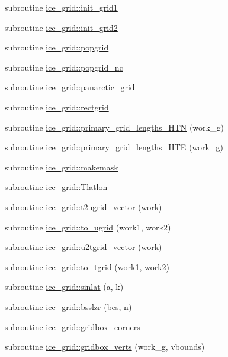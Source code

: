 \begin{DoxyCompactItemize}
\item 
subroutine \hyperlink{namespaceice__grid_ace97d5a2cdb55b3e8caa37f125635f14}{ice\_\-grid::init\_\-grid1}
\item 
subroutine \hyperlink{namespaceice__grid_a1443c2d00f599d16be96edeb376c3e97}{ice\_\-grid::init\_\-grid2}
\item 
subroutine \hyperlink{namespaceice__grid_a24e5c873e7aef7bffaa80de04d205f1c}{ice\_\-grid::popgrid}
\item 
subroutine \hyperlink{namespaceice__grid_a830c0e85f52a27b04394190410c74730}{ice\_\-grid::popgrid\_\-nc}
\item 
subroutine \hyperlink{namespaceice__grid_ae6e42c3f57ad49e30c85c71573096781}{ice\_\-grid::panarctic\_\-grid}
\item 
subroutine \hyperlink{namespaceice__grid_a2368fc9f9adb4dd4c869e9e618923640}{ice\_\-grid::rectgrid}
\item 
subroutine \hyperlink{namespaceice__grid_a2eadb37992f11dff1d497737f391f976}{ice\_\-grid::primary\_\-grid\_\-lengths\_\-HTN} (work\_\-g)
\item 
subroutine \hyperlink{namespaceice__grid_a101630e53001c3cf050c5c5672199c25}{ice\_\-grid::primary\_\-grid\_\-lengths\_\-HTE} (work\_\-g)
\item 
subroutine \hyperlink{namespaceice__grid_a3b4d1b3eb2836fed2bf8389411d1dbf0}{ice\_\-grid::makemask}
\item 
subroutine \hyperlink{namespaceice__grid_a6d381958e459356fe9b135a76d3423e4}{ice\_\-grid::Tlatlon}
\item 
subroutine \hyperlink{namespaceice__grid_afcc1556abeece73115e27355f13c1f66}{ice\_\-grid::t2ugrid\_\-vector} (work)
\item 
subroutine \hyperlink{namespaceice__grid_af263876d35043749020fcd9c12766b3f}{ice\_\-grid::to\_\-ugrid} (work1, work2)
\item 
subroutine \hyperlink{namespaceice__grid_aefb15c768a63706ec6a5155d55b6c5a9}{ice\_\-grid::u2tgrid\_\-vector} (work)
\item 
subroutine \hyperlink{namespaceice__grid_a63f5a2363aeb189e80ffb2294d20c42b}{ice\_\-grid::to\_\-tgrid} (work1, work2)
\item 
subroutine \hyperlink{namespaceice__grid_ac06419b8058ea2a7164cf726ac07b544}{ice\_\-grid::sinlat} (a, k)
\item 
subroutine \hyperlink{namespaceice__grid_a26e7cc8fc629dd16d1f98839ebb9b5ff}{ice\_\-grid::bsslzr} (bes, n)
\item 
subroutine \hyperlink{namespaceice__grid_a5cd4fd8007e449d3daca8a8ddd45b1b0}{ice\_\-grid::gridbox\_\-corners}
\item 
subroutine \hyperlink{namespaceice__grid_acfca25b6f395314aa5ccacde317d5bac}{ice\_\-grid::gridbox\_\-verts} (work\_\-g, vbounds)
\end{DoxyCompactItemize}
